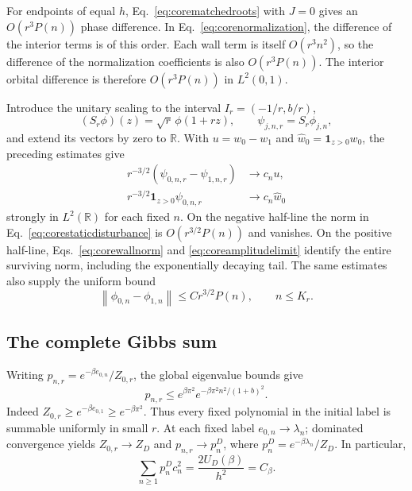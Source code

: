 \documentclass[aps,pra,reprint,superscriptaddress,longbibliography]{revtex4-2}
\newcommand{\R}{\mathbb R}
\newcommand{\norm}[1]{\left\lVert#1\right\rVert}
\begin{document}
For endpoints of equal $h$, Eq.~\eqref{eq:corematchedroots} with $J=0$
gives an $O(r^3P(n))$ phase difference. In
Eq.~\eqref{eq:corenormalization}, the difference of the interior terms is
of this order. Each wall term is itself $O(r^3n^2)$, so the difference of
the normalization coefficients is also $O(r^3P(n))$. The interior
orbital difference is therefore $O(r^3P(n))$ in $L^2(0,1)$.

Introduce the unitary scaling to the interval
$I_r=(-1/r,b/r)$,
\begin{equation}
 (S_r\phi)(z)=\sqrt r\,\phi(1+rz),\qquad
 \psi_{j,n,r}=S_r\phi_{j,n},
 \label{eq:corescaling}
\end{equation}
and extend its vectors by zero to $\R$. With $u=w_0-w_1$ and
$\widehat w_0=\mathbf1_{z>0}w_0$, the preceding estimates give
\begin{align}
 r^{-3/2}(\psi_{0,n,r}-\psi_{1,n,r})&\longrightarrow c_nu,
       \label{eq:corestaticdisturbance}\\
 r^{-3/2}\mathbf1_{z>0}\psi_{0,n,r}&\longrightarrow
           c_n\widehat w_0
       \label{eq:corestaticsource}
\end{align}
strongly in $L^2(\R)$ for each fixed $n$. On the negative half-line the
norm in Eq.~\eqref{eq:corestaticdisturbance} is
$O(r^{3/2}P(n))$ and vanishes. On the positive half-line,
Eqs.~\eqref{eq:corewallnorm} and \eqref{eq:coreamplitudelimit} identify
the entire surviving norm, including the exponentially decaying tail.
The same estimates also supply the uniform bound
\begin{equation}
 \norm{\phi_{0,n}-\phi_{1,n}}\le Cr^{3/2}P(n),
 \qquad n\le K_r.
 \label{eq:coreorbitaldifferencebound}
\end{equation}

\subsection{The complete Gibbs sum}

Writing $p_{n,r}=e^{-\beta e_{0,n}}/Z_{0,r}$, the global eigenvalue bounds
give
\begin{equation}
 p_{n,r}\le e^{\beta\pi^2}
       e^{-\beta\pi^2n^2/(1+b)^2}.
 \label{eq:coregibbsmajorant}
\end{equation}
Indeed $Z_{0,r}\ge e^{-\beta e_{0,1}}\ge e^{-\beta\pi^2}$.
Thus every fixed polynomial in the initial label is summable uniformly in
small $r$. At each fixed label $e_{0,n}\to\lambda_n$; dominated
convergence yields $Z_{0,r}\to Z_D$ and $p_{n,r}\to p_n^D$, where
$p_n^D=e^{-\beta\lambda_n}/Z_D$. In particular,
\begin{equation}
 \sum_{n\ge1}p_n^Dc_n^2=\frac{2U_D(\beta)}{h^2}=C_\beta.
 \label{eq:corethermalcoefficient}
\end{equation}
\end{document}

